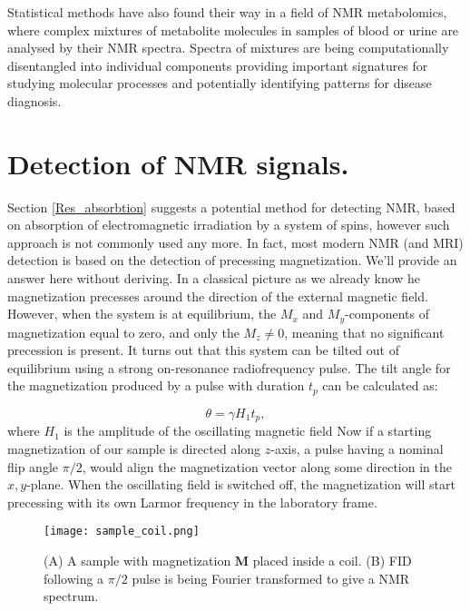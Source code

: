 \documentclass[a4paper, 12pt]{article}
\begin{document}
  Statistical methods have also found their way in a field of NMR metabolomics, where complex mixtures of metabolite molecules in samples of blood or urine are analysed by their NMR spectra. Spectra of mixtures are being computationally disentangled into individual components providing important signatures for studying molecular processes and potentially identifying patterns for disease diagnosis.


\section{Detection of NMR signals.}

 Section \ref{Res_absorbtion} suggests a potential method for detecting NMR, based on absorption of electromagnetic irradiation by a system of spins, however such approach is not commonly used any more. In fact, most modern NMR (and MRI) detection is based on the detection of precessing magnetization. We'll provide an answer here without deriving.
 In a classical picture as we already know he magnetization precesses around the direction of the external magnetic field. However, when the system is at equilibrium, the $M_{x}$ and $M_{y}$-components of magnetization equal to zero, and only the $M_{z} \neq 0$, meaning that no significant precession is present.
 It turns out that this system can be tilted out of equilibrium using a strong on-resonance radiofrequency pulse. The tilt angle for the magnetization produced by a pulse with duration $t_p$ can be calculated as: 
  
\begin{equation}
\theta = \gamma H_1 t_p,
\end{equation}
where $H_1$ is the amplitude of the oscillating magnetic field
Now if a starting magnetization of our sample is directed along $z$-axis, a pulse having a nominal flip angle $\pi/2$, would align the magnetization vector along some direction in the $x,y$-plane. When the oscillating field is switched off, the magnetization will start precessing with its own Larmor frequency in the laboratory frame.

\begin{figure}[ht]
\caption{(A) A sample with magnetization $\bm{M}$ placed inside a coil. (B) FID following a $\pi/2$ pulse is being Fourier transformed to give a NMR spectrum.}
\label{fig:sample_coil}
\centering
\texttt{[image: sample\_coil.png]}
\end{figure}
\end{document}
